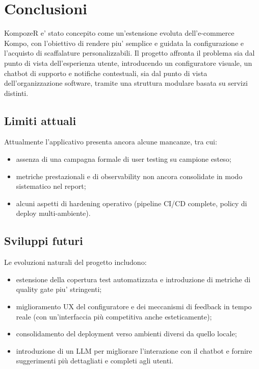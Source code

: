 \section{Conclusioni}

KompozeR e' stato concepito come un'estensione evoluta dell'e-commerce Kompo, con l'obiettivo di rendere piu' semplice e guidata la configurazione e l'acquisto di scaffalature personalizzabili. 
Il progetto affronta il problema sia dal punto di vista dell'esperienza utente, introducendo un configuratore visuale, un chatbot di supporto e notifiche contestuali, sia dal punto di vista dell'organizzazione software, tramite una struttura modulare basata su servizi distinti.

\subsection{Limiti attuali}

Attualmente l'applicativo presenta ancora alcune mancanze, tra cui:

\begin{itemize}
	\item assenza di una campagna formale di user testing su campione esteso;
	\item metriche prestazionali e di observability non ancora consolidate in modo sistematico nel report;
	\item alcuni aspetti di hardening operativo (pipeline CI/CD complete, policy di deploy multi-ambiente).
\end{itemize}

\subsection{Sviluppi futuri}

Le evoluzioni naturali del progetto includono:

\begin{itemize}
	\item estensione della copertura test automatizzata e introduzione di metriche di quality gate piu' stringenti;
	\item miglioramento UX del configuratore e dei meccanismi di feedback in tempo reale (con un'interfaccia più competitiva anche esteticamente);
	\item consolidamento del deployment verso ambienti diversi da quello locale;
	\item introduzione di un LLM per migliorare l'interazione con il chatbot e fornire suggerimenti più dettagliati e completi agli utenti.
\end{itemize}


\newpage
